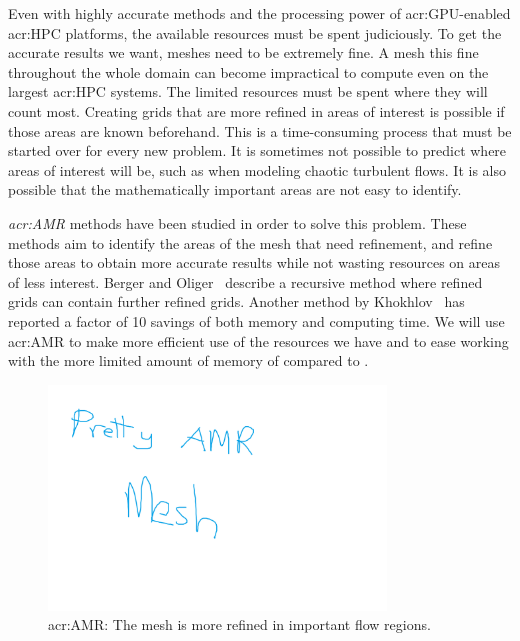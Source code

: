 Even with highly accurate methods and the processing power of \acrshort{acr:GPU}-enabled
\acrshort{acr:HPC} platforms, the available resources must be spent judiciously. To get the accurate
results we want, meshes need to be extremely fine. A mesh this fine throughout the whole domain can
become impractical to compute even on the largest \acrshort{acr:HPC} systems. The limited resources
must be spent where they will count most. Creating grids that are more refined in areas of interest
is possible if those areas are known beforehand. This is a time-consuming process that must be
started over for every new problem. It is sometimes not possible to predict where areas of interest
will be, such as when modeling chaotic turbulent flows. It is also possible that the mathematically
important areas are not easy to identify. 

\textit{\Acrfull{acr:AMR}} methods have been studied in order to solve this problem. These methods
aim to identify the areas of the mesh that need refinement, and refine those areas to obtain more
accurate results while not wasting resources on areas of less interest. Berger and
Oliger~\cite{Berger1984} describe a recursive method where refined grids can contain further refined
grids. Another method by Khokhlov~\cite{Khokhlov1998} has reported a factor of 10 savings of both
memory and computing time. We will use \acrlong{acr:AMR} to make more efficient use of the resources
we have and to ease working with the more limited amount of memory of  compared
to .

\begin{figure}[H]
	\centering
	\includegraphics[width=0.8\textwidth]{Chapter_introduction/media/adaptive_mesh_refinement}
	\caption{\Acrlong{acr:AMR}: The mesh is more refined in important flow regions.}\label{fig:intro_amr}
\end{figure}

